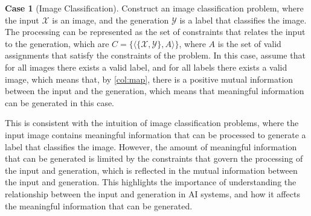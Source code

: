 \documentclass[stu,12pt]{apa7}
\theoremstyle{definition}
\newtheorem{case}{Case}[section]
\begin{document}
\begin{case}[Image Classification]
    Construct an image classification problem, where the input $\mathcal{X}$ is an image, and the generation $\mathcal{Y}$ is a label that classifies the image. The processing can be represented as the set of constraints that relates the input to the generation, which are $C = \{\langle \{\mathcal{X},\mathcal{Y}\}, A \rangle\}$, where $A$ is the set of valid assignments that satisfy the constraints of the problem. In this case, assume that for all images there exists a valid label, and for all labels there exists a valid image, which means that, by \ref{col:map}, there is a positive mutual information between the input and the generation, which means that meaningful information can be generated in this case.

    This is consistent with the intuition of image classification problems, where the input image contains meaningful information that can be processed to generate a label that classifies the image. However, the amount of meaningful information that can be generated is limited by the constraints that govern the processing of the input and generation, which is reflected in the mutual information between the input and generation. This highlights the importance of understanding the relationship between the input and generation in AI systems, and how it affects the meaningful information that can be generated.
\end{case}
\end{document}
